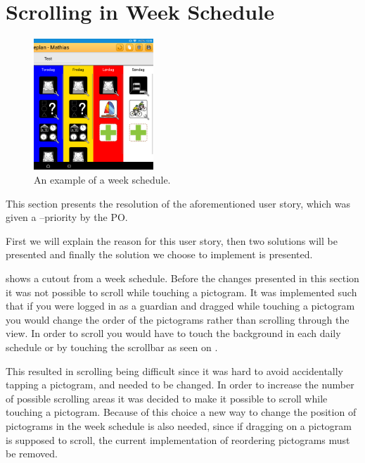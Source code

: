\section{Scrolling in Week Schedule}

\begin{figure} 
    \centering
        \includegraphics[width=0.4\textwidth]{figures/img/screenshots/weekplan_schedule.png}
    \caption{An example of a week schedule.}
    \label{fig:weekschedule}
    \vspace{-20pt}
\end{figure}

This section presents the resolution of the aforementioned user story, which was given a \phigh--priority by the PO.

First we will explain the reason for this user story, then two solutions will be presented and finally the solution we choose to implement is presented. 

 shows a cutout from a week schedule. 
Before the changes presented in this section it was not possible to scroll while touching a pictogram. 
It was implemented such that if you were logged in as a guardian and dragged while touching a pictogram you would change the order of the pictograms rather than scrolling through the view.
In order to scroll you would have to touch the background in each daily schedule or by touching the scrollbar as seen on .

This resulted in scrolling being difficult since it was hard to avoid accidentally tapping a pictogram, and needed to be changed.
In order to increase the number of possible scrolling areas it was decided to make it possible to scroll while touching a pictogram.
Because of this choice a new way to change the position of pictograms in the week schedule is also needed, since if dragging on a pictogram is supposed to scroll, the current implementation of reordering pictograms must be removed.

